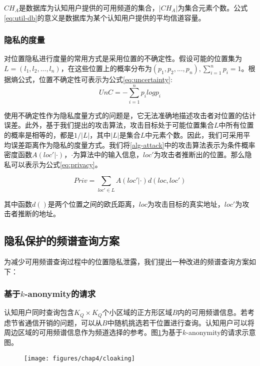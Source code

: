$CH_{A}$是数据库为认知用户提供的可用频道的集合，$|CH_{A}|$为集合元素个数。公式\ref{eq:util-db}的意义是数据库为某个认知用户提供的平均信道容量。

\subsubsection{隐私的度量}

对位置隐私进行度量的常用方式是采用位置的不确定性。假设可能的位置集为$L=(l_{1},l_{2},...,l_{n})$，在这些位置上的概率分布为$(p_{1},p_{2},...,p_{n}),\sum\limits_{i=1}^{n} p_{i} = 1$。根据熵公式，位置不确定性可表示为公式\ref{eq:uncertainty}:
\begin{equation}\label{eq:uncertainty}
UnC=-\sum\limits_{i=1}^{n}p_{i}log p_{i}
\end{equation}

使用不确定性作为隐私度量方式的问题是，它无法准确地描述攻击者对位置的估计误差。此外，基于我们提出的攻击算法，攻击目标处于可能位置集合$L$中所有位置的概率是相等的，都是$1/|L|$，其中$|L|$是集合$L$中元素个数。因此，我们可采用平均误差距离作为隐私的度量方式。我们将\ref{alg-attack}中的攻击算法表示为条件概率密度函数$A(loc'|\cdot)$，$\cdot$为算法中的输入信息，$loc'$为攻击者推断出的位置。那么隐私可以表示为公式\ref{eq:privacy}。

\begin{equation}\label{eq:privacy}
Priv=\sum\limits_{loc' \in L} A(loc'|\cdot)d(loc,loc')
\end{equation}

其中函数$d()$是两个位置之间的欧氏距离，$loc$为攻击目标的真实地址，$loc'$为攻击者推断的地址。


\subsection{隐私保护的频谱查询方案}\label{subsec:privacy-preserving}

为减少可用频谱查询过程中的位置隐私泄露，我们提出一种改进的频谱查询方案如下：
\subsubsection{基于$k$-anonymity的请求}
认知用户同时查询包含$K_{Q} \times K_{Q}$个小区域的正方形区域$B$内的可用频谱信息。若考虑节省通信开销的问题，可以从$B$中随机挑选若干位置进行查询。认知用户可以将周边区域的可用频谱信息作为频道选择的参考。图\ref{fig:cloaking}为基于$k$-anonymity的请求示意图。

\begin{figure}[!htp]\label{fig:cloaking}
  \centering
  \texttt{[image: figures/chap4/cloaking]}
\end{figure}

